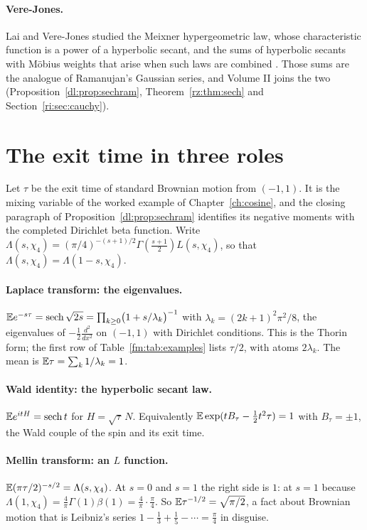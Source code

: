 \paragraph{Vere-Jones.} Lai and Vere-Jones studied the Meixner hypergeometric law, whose characteristic function is a power of a hyperbolic secant, and the sums of hyperbolic secants with M\"obius weights that arise when such laws are combined \cite{LVJ}. Those sums are the analogue of Ramanujan's Gaussian series, and Volume II joins the two (Proposition~\ref{dl:prop:sechram}, Theorem~\ref{rz:thm:sech} and Section~\ref{ri:sec:cauchy}).
\section{The exit time in three roles}\label{r:sec:vj}

Let $\tau$ be the exit time of standard Brownian motion from $(-1,1)$. It is the mixing variable of the worked example of Chapter~\ref{ch:cosine}, and the closing paragraph of Proposition~\ref{dl:prop:sechram} identifies its negative moments with the completed Dirichlet beta function. Write $\Lambda(s,\chi_4)=(\pi/4)^{-(s+1)/2}\Gamma(\frac{s+1}2)L(s,\chi_4)$, so that $\Lambda(s,\chi_4)=\Lambda(1-s,\chi_4)$.

\paragraph{Laplace transform: the eigenvalues.} $\mathbb{E} e^{-s\tau}=\operatorname{sech}\sqrt{2s}=\prod_{k\ge0}\bigl(1+s/\lambda_k\bigr)^{-1}$ with $\lambda_k=(2k+1)^2\pi^2/8$, the eigenvalues of $-\frac12\frac{d^2}{dx^2}$ on $(-1,1)$ with Dirichlet conditions. This is the Thorin form; the first row of Table~\ref{fm:tab:examples} lists $\tau/2$, with atoms $2\lambda_k$. The mean is $\mathbb{E}\tau=\sum_k1/\lambda_k=1$.

\paragraph{Wald identity: the hyperbolic secant law.} $\mathbb{E} e^{itH}=\operatorname{sech} t$ for $H=\sqrt\tau\,N$. Equivalently $\mathbb{E}\exp(tB_\tau-\frac12t^2\tau)=1$ with $B_\tau=\pm1$, the Wald couple of the spin and its exit time.

\paragraph{Mellin transform: an $L$ function.} $\mathbb{E}(\pi\tau/2)^{-s/2}=\Lambda(s,\chi_4)$. At $s=0$ and $s=1$ the right side is $1$: at $s=1$ because $\Lambda(1,\chi_4)=\frac4\pi\Gamma(1)\beta(1)=\frac4\pi\cdot\frac\pi4$. So $\mathbb{E}\tau^{-1/2}=\sqrt{\pi/2}$, a fact about Brownian motion that is Leibniz's series $1-\frac13+\frac15-\cdots=\frac\pi4$ in disguise.

